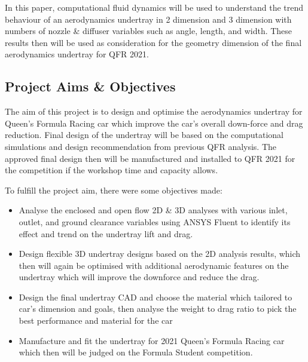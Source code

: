 In this paper, computational fluid dynamics will be used to understand the trend behaviour of an aerodynamics undertray in 2 dimension and 3 dimension with numbers of nozzle \& diffuser variables such as angle, length, and width. These results then will be used as consideration for the geometry dimension of the final aerodynamics undertray for QFR 2021.

\subsection{Project Aims \& Objectives}
The aim of this project is to design and optimise the aerodynamics undertray for Queen's Formula Racing car which improve the car's overall down-force and drag reduction. Final design of the undertray will be based on the computational simulations and design recommendation from previous QFR analysis. The approved final design then will be manufactured and installed to QFR 2021 for the competition if the workshop time and capacity allows.

\noindent
To fulfill the project aim, there were some objectives made:
\begin{itemize}
    \item Analyse the enclosed and open flow 2D \& 3D analyses with various inlet, outlet, and ground clearance variables  using ANSYS Fluent to identify its effect and trend on the undertray lift and drag. 
    \item Design flexible 3D undertray designs based on the 2D analysis results, which then will again be optimised with additional aerodynamic features on the undertray which will improve the downforce and reduce the drag.
	\item Design the final undertray CAD and choose the material which tailored to car’s dimension and goals, then analyse the weight to drag ratio to pick the best performance and material for the car
    \item Manufacture and fit the undertray for 2021 Queen’s Formula Racing car which then will be judged on the Formula Student competition.
\end{itemize}